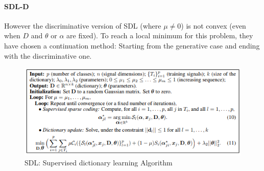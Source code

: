 \paragraph{SDL-D} However the discriminative version of SDL (where $\mu \neq 0$) is not convex (even when $D$ and $\theta$ or $\alpha$ are fixed). To reach a local minimum for this problem, they have chosen a continuation method: Starting from the generative case and ending with the discriminative one.
\begin{figure}[h]
 \centering
 \includegraphics[scale=0.9]{SDL-D.png}
 \caption{SDL: Supervised dictionary learning Algorithm  \cite{mairal:inria-00322431}}
\end{figure}


